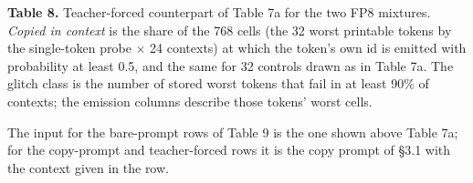 \documentclass[11pt]{article}
\newenvironment{tabcaption}{\par\vspace{3pt}\small\setlength{\parindent}{0pt}\ignorespaces}{\par\vspace{14pt}}
\begin{document}
\begin{tabcaption}
\textbf{Table 8.} Teacher-forced counterpart of Table 7a for the two FP8 mixtures. \emph{Copied in context} is the share of the 768 cells (the 32 worst printable tokens by the single-token probe \ensuremath{\times} 24 contexts) at which the token's own id is emitted with probability at least 0.5, and the same for 32 controls drawn as in Table 7a. The glitch class is the number of stored worst tokens that fail in at least 90\% of contexts; the emission columns describe those tokens' worst cells.
\end{tabcaption}

The input for the bare-prompt rows of Table 9 is the one shown above Table 7a; for the copy-prompt and teacher-forced rows it is the copy prompt of §3.1 with the context given in the row.

\begingroup\footnotesize\setlength{\tabcolsep}{4pt}\renewcommand{\arraystretch}{1.15}
\end{document}
